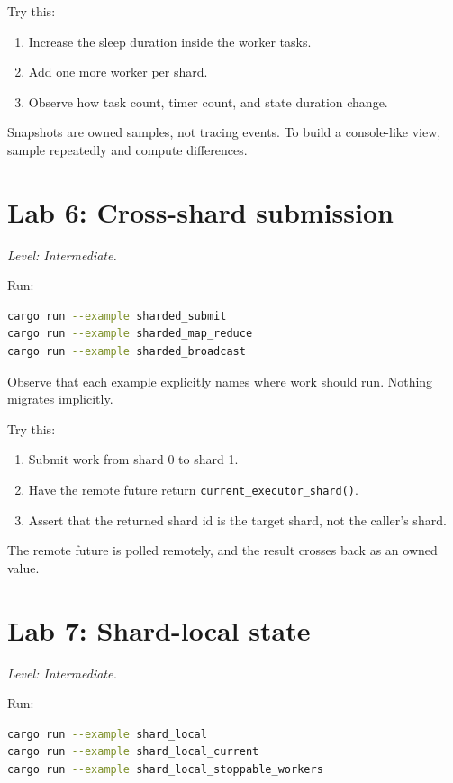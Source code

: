 Try this:

\begin{enumerate}
    \item Increase the sleep duration inside the worker tasks.
    \item Add one more worker per shard.
    \item Observe how task count, timer count, and state duration change.
\end{enumerate}

Snapshots are owned samples, not tracing events. To build a
console-like view, sample repeatedly and compute differences.

\section{Lab 6: Cross-shard submission}

\textit{Level: Intermediate.}

Run:

\begin{lstlisting}[language=bash,caption={Cross-shard examples}]
cargo run --example sharded_submit
cargo run --example sharded_map_reduce
cargo run --example sharded_broadcast
\end{lstlisting}

Observe that each example explicitly names where work should run. Nothing
migrates implicitly.

Try this:

\begin{enumerate}
    \item Submit work from shard 0 to shard 1.
    \item Have the remote future return \texttt{current\_executor\_shard()}.
    \item Assert that the returned shard id is the target shard, not the
          caller's shard.
\end{enumerate}

The remote future is polled remotely, and the result crosses back
as an owned value.

\section{Lab 7: Shard-local state}

\textit{Level: Intermediate.}

Run:

\begin{lstlisting}[language=bash,caption={Shard-local examples}]
cargo run --example shard_local
cargo run --example shard_local_current
cargo run --example shard_local_stoppable_workers
\end{lstlisting}

